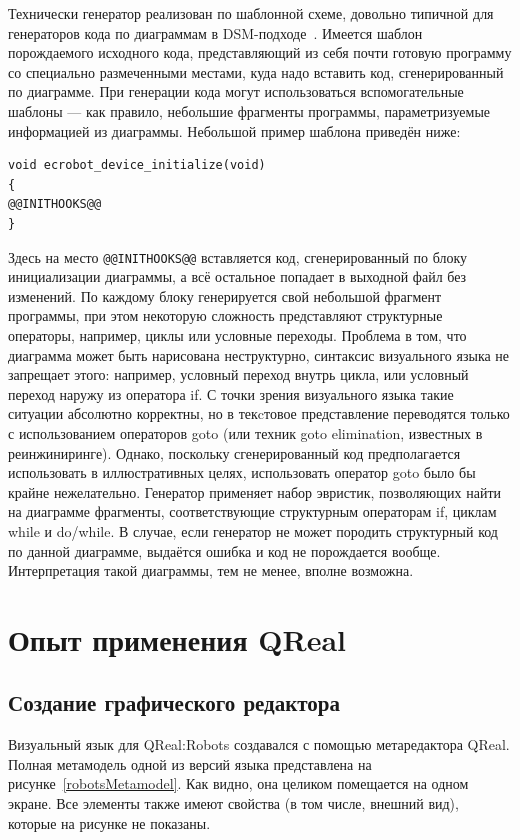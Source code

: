 \documentclass[a4paper]{article}
\begin{document}
Технически генератор реализован по шаблонной схеме, довольно типичной для генераторов кода по диаграммам в DSM-подходе~\cite{theBook}. Имеется шаблон порождаемого исходного кода, представляющий из себя почти готовую программу со специально размеченными местами, куда надо вставить код, сгенерированный по диаграмме. При генерации кода могут использоваться вспомогательные шаблоны --- как правило, небольшие фрагменты программы, параметризуемые информацией из диаграммы. Небольшой пример шаблона приведён ниже:
\begin{verbatim}
void ecrobot_device_initialize(void)
{
@@INITHOOKS@@
}
\end{verbatim}
Здесь на место \verb|@@INITHOOKS@@| вставляется код, сгенерированный по блоку инициализации диаграммы, а всё остальное попадает в выходной файл без изменений. По каждому блоку генерируется свой небольшой фрагмент программы, при этом некоторую сложность представляют структурные операторы, например, циклы или условные переходы. Проблема в том, что диаграмма может быть нарисована неструктурно, синтаксис визуального языка не запрещает этого: например, условный переход внутрь цикла, или условный переход наружу из оператора if. С точки зрения визуального языка такие ситуации абсолютно корректны, но в текcтовое представление переводятся только с использованием операторов goto (или техник goto elimination, известных в реинжиниринге). Однако, поскольку сгенерированный код предполагается использовать в иллюстративных целях, использовать оператор goto было бы крайне нежелательно. Генератор применяет набор эвристик, позволяющих найти на диаграмме фрагменты, соответствующие структурным операторам if, циклам while и do/while. В случае, если генератор не может породить структурный код по данной диаграмме, выдаётся ошибка и код не порождается вообще. Интерпретация такой диаграммы, тем не менее, вполне возможна.

\section{Опыт применения QReal}
\subsection{Создание графического редактора}
Визуальный язык для QReal:Robots создавался с помощью метаредактора QReal. Полная метамодель одной из версий языка представлена на рисунке~\ref{robotsMetamodel}. Как видно, она целиком помещается на одном экране. Все элементы также имеют свойства (в том числе, внешний вид), которые на рисунке не показаны.
\end{document}
